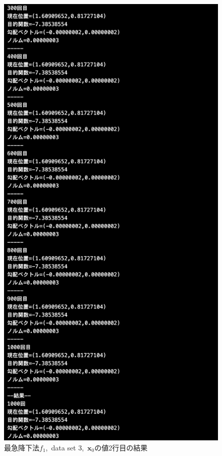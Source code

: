 \documentclass[12pt]{jarticle}
\begin{document}
\begin{figure}[h]
\begin{minipage}{0.5\hsize}
    \end{minipage}
    \begin{minipage}{0.5\hsize}
        \begin{center}
            \includegraphics[scale=0.2]{kadai1_1s_out3_2_3.png}
        \end{center}
    \end{minipage}
    \caption{最急降下法$f_1$,\ data set 3,\ $\boldsymbol{x}_0$の値2行目の結果}
\end{figure}
\end{document}

